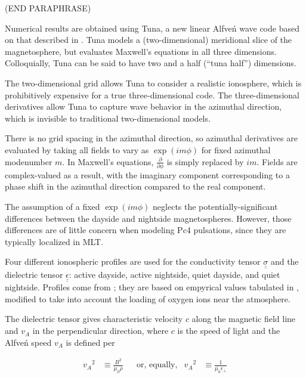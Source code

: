 \documentclass[draft,linenumbers]{agujournal}
\begin{document}
(END PARAPHRASE)








Numerical results are obtained using Tuna, a new linear Alfve\'n wave code based on that described in \citet{lysak_2013}. Tuna models a (two-dimensional) meridional slice of the magnetosphere, but evaluates Maxwell's equations in all three dimensions. Colloquially, Tuna can be said to have two and a half (``tuna half'') dimensions.

The two-dimensional grid allows Tuna to consider a realistic ionosphere, which is prohibitively expensive for a true three-dimensional code. The three-dimensional derivatives allow Tuna to capture wave behavior in the azimuthal direction, which is invisible to traditional two-dimensional models.

There is no grid spacing in the azimuthal direction, so azimuthal derivatives are evaluated by taking all fields to vary as $\exp \left(i m \phi\right)$ for fixed azimuthal modenumber $m$. In Maxwell's equations, $\frac{\partial}{\partial \phi}$ is simply replaced by $i m$. Fields are complex-valued as a result, with the imaginary component corresponding to a phase shift in the azimuthal direction compared to the real component.

The assumption of a fixed $\exp \left(i m \phi\right)$ neglects the potentially-significant differences between the dayside and nightside magnetospheres. However, those differences are of little concern when modeling Pc4 pulsations, since they are typically localized in MLT\citep{anderson_1990,dai_2015,engebretson_1992,liu_2009}.


Four different ionospheric profiles are used for the conductivity tensor $\underline{\underline{\sigma}}$ and the dielectric tensor $\underline{\underline{\epsilon}}$: active dayside, active nightside, quiet dayside, and quiet nightside. Profiles come from \citet{lysak_2013}; they are based on empyrical values tabulated in \citet{kelley_1989}, modified to take into account the loading of oxygen ions near the atmosphere.

The dielectric tensor gives characteristic velocity $c$ along the magnetic field line and $v_A$ in the perpendicular direction, where $c$ is the speed of light and the Alfve\'n speed $v_A$ is defined per

\begin{linenomath*}
\begin{align}
    \label{def_va}
    {v_A}^2 &\equiv \frac{B^2}{\mu_0\rho} &
    & \text{or, equally,} &
    {v_A}^2 &\equiv \frac{1}{\mu_0\epsilon_\bot}
\end{align}
\end{linenomath*}
\end{document}
